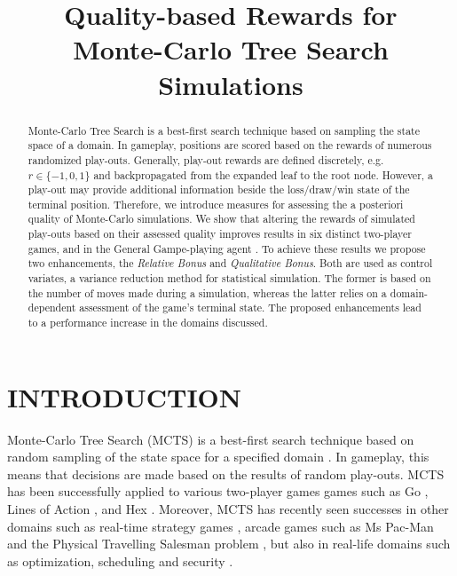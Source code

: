 \documentclass{ecai2014}
\begin{document}
\title{Quality-based Rewards for \\ Monte-Carlo Tree Search Simulations}


\maketitle


\begin{abstract}
Monte-Carlo Tree Search is a best-first search technique based on sampling the state space of a domain. In gameplay, positions are scored based on the rewards of numerous randomized play-outs. Generally, play-out rewards are defined discretely, e.g. $r \in \{-1, 0, 1\}$ and backpropagated from the expanded leaf to the root node. However, a play-out may provide additional information beside the loss/draw/win state of the terminal position. Therefore, we introduce measures for assessing the a posteriori quality of Monte-Carlo simulations. We show that altering the rewards of simulated play-outs based on their assessed quality improves results in six distinct two-player games, and in the General Gampe-playing agent {}. To achieve these results we propose two enhancements, the \emph{Relative Bonus} and \emph{Qualitative Bonus}. Both are used as control variates, a variance reduction method for statistical simulation. The former is based on the number of moves made during a simulation, whereas the latter relies on a domain-dependent assessment of the game's terminal state. The proposed enhancements lead to a performance increase in the domains discussed.
\end{abstract}

\section{INTRODUCTION}
\label{sec:intro}
Monte-Carlo Tree Search (MCTS) is a best-first search technique based on random sampling of the state space for a specified domain \cite{coulom2007efficient,kocsis2006bandit}. In gameplay, this means that decisions are made based on the results of random play-outs. MCTS has been successfully applied to various two-player games games such as Go \cite{lee2010current}, Lines of Action \cite{Winands2010b}, and Hex \cite{arneson2010monte}. Moreover, MCTS has recently seen successes in other domains such as real-time strategy games \cite{browne2012survey}, arcade games such as Ms Pac-Man \cite{enhancementspacmancig12} and the Physical Travelling Salesman problem \cite{powleytsp}, but also in real-life domains such as optimization, scheduling and security \cite{browne2012survey}.
\end{document}
